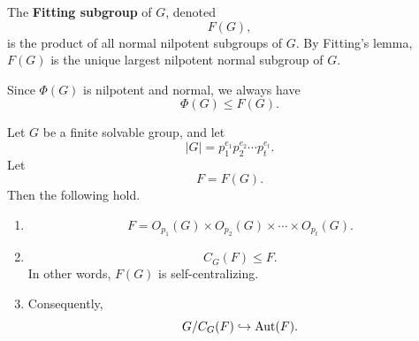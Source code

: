 \begin{definition}
The \textbf{Fitting subgroup} of \(G\), denoted
\[
    F(G),
\]
is the product of all normal nilpotent subgroups of \(G\). By Fitting's lemma,
\(F(G)\) is the unique largest nilpotent normal subgroup of \(G\).
\end{definition}

Since \(\Phi(G)\) is nilpotent and normal, we always have
\[
    \Phi(G)\leq F(G).
\]

\begin{theorem}
Let \(G\) be a finite solvable group, and let
\[
    |G|=p_1^{e_1}p_2^{e_2}\cdots p_t^{e_t}.
\]
Let
\[
    F=F(G).
\]
Then the following hold.

\begin{enumerate}[label=(\arabic*)]
    \item
    \[
        F=O_{p_1}(G)\times O_{p_2}(G)\times \cdots \times O_{p_t}(G).
    \]

    \item
    \[
        C_G(F)\leq F.
    \]
    In other words, \(F(G)\) is self-centralizing.

    \item Consequently,
    \[
        G/C_G(F)\hookrightarrow \operatorname{Aut}(F).
    \]
\end{enumerate}
\end{theorem}

